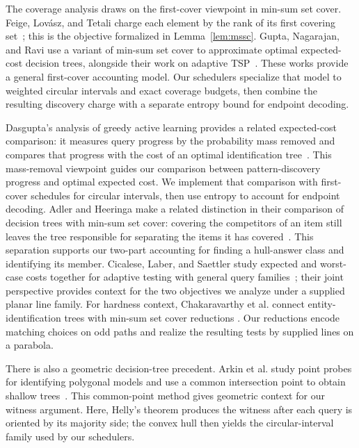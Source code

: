 The coverage analysis draws on the first-cover viewpoint in min-sum
set cover. Feige, Lov\'asz, and Tetali charge each element by the rank
of its first covering set~\cite{flt2004}; this is the objective
formalized in Lemma~\ref{lem:mssc}. Gupta, Nagarajan, and Ravi use a
variant of min-sum set cover to approximate optimal expected-cost
decision trees, alongside their work on adaptive TSP~\cite{gupta2017}.
These works provide a
general first-cover accounting model. Our schedulers specialize that
model to weighted circular intervals and exact coverage budgets, then
combine the resulting discovery charge with a separate entropy bound
for endpoint decoding.

Dasgupta's analysis of greedy active learning provides a related
expected-cost comparison: it measures query progress by the probability
mass removed and compares that progress with the cost of an optimal
identification tree~\cite{dasgupta2004}. This mass-removal viewpoint
guides our comparison between pattern-discovery progress and optimal
expected cost. We implement that comparison with first-cover schedules
for circular intervals, then use entropy to account for endpoint
decoding. Adler and Heeringa make a related distinction in their
comparison of decision trees with min-sum set cover: covering the
competitors of an item still leaves the tree responsible for separating
the items it has covered~\cite{adlerheeringa2012}. This separation
supports our two-part accounting for finding a hull-answer class and
identifying its member. Cicalese, Laber, and Saettler study expected and
worst-case costs together for adaptive testing with general query
families~\cite{cicalese2017}; their joint perspective provides context
for the two objectives we analyze under a supplied planar line family.
For hardness context, Chakaravarthy et al. connect
entity-identification trees with min-sum set cover reductions
\cite{chakaravarthy2011}. Our reductions encode matching choices on
odd paths and realize the resulting tests by supplied lines on a
parabola.

There is also a geometric decision-tree precedent. Arkin et al. study
point probes for identifying polygonal models and use a common
intersection point to obtain shallow trees~\cite{arkin1998}. This
common-point method gives geometric context for our witness argument.
Here, Helly's theorem produces the witness after each query is oriented
by its majority side; the convex hull then yields the circular-interval
family used by our schedulers.

